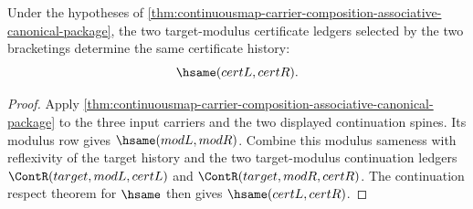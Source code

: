 \begin{theorem}
\label{thm:continuousmap-composition-associative-certificate-deterministic}
Under the hypotheses of
\autoref{thm:continuousmap-carrier-composition-associative-canonical-package},
the two target-modulus certificate ledgers selected by the two bracketings
determine the same certificate history:
$$
\hsame(certL,certR).
$$
\end{theorem}
\begin{proof}
Apply
\autoref{thm:continuousmap-carrier-composition-associative-canonical-package}
to the three input carriers and the two displayed continuation spines. Its
modulus row gives $\hsame(modL,modR)$. Combine this modulus sameness with
reflexivity of the target history and the two target-modulus continuation
ledgers $\ContR(target,modL,certL)$ and $\ContR(target,modR,certR)$. The
continuation respect theorem for $\hsame$ then gives $\hsame(certL,certR)$.
\end{proof}

